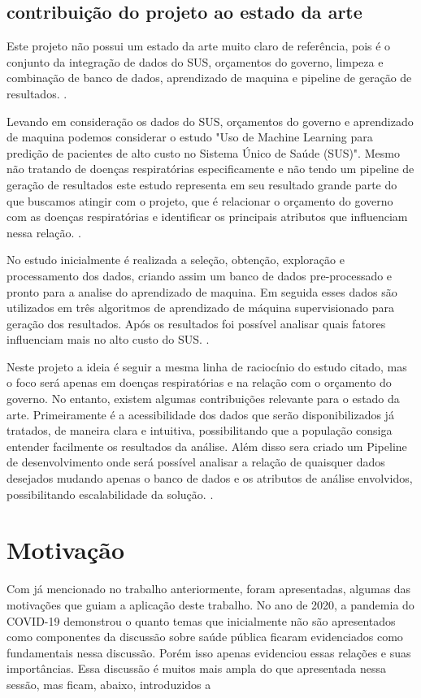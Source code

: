\documentclass[journal]{IEEEtran}
\begin{document}
\subsection{contribuição do projeto ao estado da arte}
Este projeto não possui um estado da arte muito claro de referência, pois é o conjunto da integração de dados do SUS, orçamentos do governo, limpeza e combinação de banco de dados, aprendizado de maquina e pipeline de geração de resultados. \cite{estado_arte}.

Levando em consideração os dados do SUS, orçamentos do governo e aprendizado de maquina podemos considerar o estudo "Uso de Machine Learning para predição de pacientes de alto custo no Sistema Único de Saúde (SUS)". Mesmo não tratando de doenças respiratórias especificamente e não tendo um pipeline de geração de resultados este estudo representa em seu resultado grande parte do que buscamos atingir com o projeto, que é relacionar o orçamento do governo com as doenças respiratórias e identificar os principais atributos que influenciam nessa relação. \cite{estado_arte}.

No estudo inicialmente é realizada a seleção, obtenção, exploração e processamento dos dados, criando assim um banco de dados pre-processado e pronto para a analise do aprendizado de maquina. Em seguida esses dados são utilizados em três algoritmos de aprendizado de máquina supervisionado para geração dos resultados. Após os resultados foi possível analisar quais fatores influenciam mais no alto custo do SUS.   \cite{estado_arte}.

Neste projeto a ideia é seguir a mesma linha de raciocínio do estudo citado, mas o foco será apenas em doenças respiratórias e na relação com o orçamento do governo. No entanto, existem algumas contribuições relevante para o estado da arte. Primeiramente é a acessibilidade dos dados que serão disponibilizados já tratados, de maneira clara e intuitiva, possibilitando que a população consiga entender facilmente os resultados da análise. Além disso sera criado um Pipeline de desenvolvimento onde será possível analisar a relação de quaisquer dados desejados mudando apenas o banco de dados e os atributos de análise envolvidos, possibilitando escalabilidade da solução.  \cite{estado_arte}.

\section{Motivação} 
Com já mencionado no trabalho anteriormente, foram apresentadas, algumas das motivações que guiam a aplicação deste trabalho. 
No ano de 2020, a pandemia do COVID-19 demonstrou o quanto temas que inicialmente não são apresentados como componentes da discussão sobre saúde pública ficaram evidenciados como fundamentais nessa discussão. Porém isso apenas evidenciou essas relações e suas importâncias. Essa discussão é muitos mais ampla do que apresentada nessa sessão, mas ficam, abaixo, introduzidos a
\end{document}

